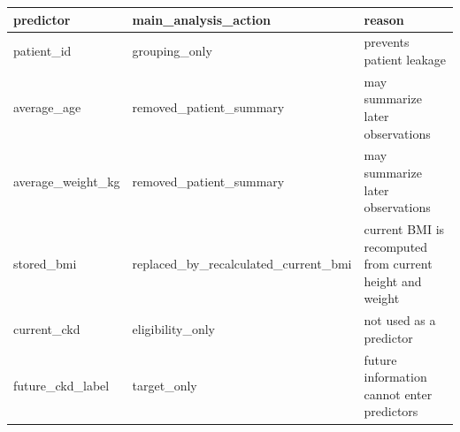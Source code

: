 \begin{tabular}{lll}
\toprule
predictor & main\_analysis\_action & reason \\
\midrule
patient\_id & grouping\_only & prevents patient leakage \\
average\_age & removed\_patient\_summary & may summarize later observations \\
average\_weight\_kg & removed\_patient\_summary & may summarize later observations \\
stored\_bmi & replaced\_by\_recalculated\_current\_bmi & current BMI is recomputed from current height and weight \\
current\_ckd & eligibility\_only & not used as a predictor \\
future\_ckd\_label & target\_only & future information cannot enter predictors \\
\bottomrule
\end{tabular}
